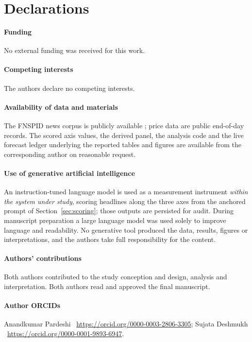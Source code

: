\section*{Declarations}

\paragraph{Funding} No external funding was received for this work.

\paragraph{Competing interests} The authors declare no competing interests.

\paragraph{Availability of data and materials} The FNSPID news corpus is publicly
available \citep{dong2024}; price data are public end-of-day records. The scored
axis values, the derived panel, the analysis code and the live forecast ledger
underlying the reported tables and figures are available from the corresponding
author on reasonable request.

\paragraph{Use of generative artificial intelligence} An instruction-tuned
language model is used as a measurement instrument \emph{within the system under
study}, scoring headlines along the three axes from the anchored prompt of
Section~\ref{sec:scoring}; those outputs are persisted for audit. During
manuscript preparation a large language model was used solely to improve language
and readability. No generative tool produced the data, results, figures or
interpretations, and the authors take full responsibility for the content.

\paragraph{Authors' contributions} Both authors contributed to the study
conception and design, analysis and interpretation. Both authors read and
approved the final manuscript.

\paragraph{Author ORCIDs}
Anandkumar Pardeshi \textemdash\ \url{https://orcid.org/0000-0003-2806-3305};
Sujata Deshmukh \textemdash\ \url{https://orcid.org/0000-0001-9893-6947}.




